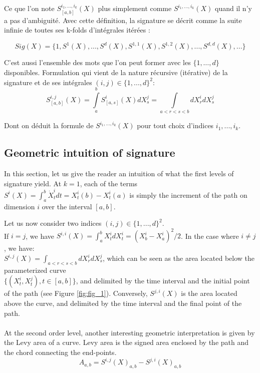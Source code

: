 \documentclass[10pt,a4paper]{article}
\begin{document}
Ce que l'on note $S_{[a, b]}^{i_1, ..., i_k}(X)$ plus simplement comme $S^{i_1, ..., i_k}(X)$ quand il n'y a pas d'ambiguité. Avec cette définition, la signature se décrit comme la suite infinie de toutes ses k-folds d'intégrales itérées : 

$$Sig(X) = \{1, S^1(X), ..., S^d(X), S^{1, 1}(X), S^{1, 2}(X), ..., S^{d, d}(X), ... \}$$

C'est aussi l'ensemble des mots que l'on peut former avec les $\{1, \ldots, d \}$ disponibles.
Formulation qui vient de la nature récursive (itérative) de la signature et de ses intégrales $(i, j) \in \{1, ..., d\}^2$:\\
$$S_{[a, b]}^{i, j}(X) = \int \limits_a^b S^i_{[a, s]}(X) dX^j_s = \int \limits_{a < r < s < b} dX^i_r dX^j_s$$

Dont on déduit la formule de  $S^{i_1, ..., i_k}(X)$ pour tout choix d'indices $i_1, ..., i_k$.



\subsection{Geometric intuition of signature}
In this section, let us give the reader an intuition of what the first levels of signature yield. At $k=1$, each of the terms $S^i(X) = \int_a^b \dot X_t^i dt = X_t^i(b) - X_t^i(a)$ is simply the increment of the path on dimension $i$ over the interval $[a, b]$.

Let us now consider two indices $(i, j) \in \{1, ..., d\}^2$.\\
If $i = j$, we have $S^{i, i}(X) = \int_a^b X_t^i dX_t^i = (X_b^i - X_a^i)^2 / 2$. In the case where $i \neq j$, we have: \\ $S^{i, j}(X) = \int_{a<r<s<b} dX_r^i dX_s^j$, which can be seen as the area located below the parameterized curve \\ $\{(X_t^i, X_t^j), t \in [a, b]\}$, and delimited by the time interval and the initial point of the path (see Figure \ref{fig:fig_1}). Conversely, $S^{j, i}(X)$ is the area located above the curve, and delimited by the time interval and the final point of the path.\\ 
\\



At the second order level, another interesting geometric interpretation is given by the Levy area of a curve. Levy area is the signed area enclosed by the path and the chord connecting the end-points. 
$$A_{a, b} = S^{i,j}(X)_{a, b} - S^{j,i}(X)_{a, b}$$
\end{document}

